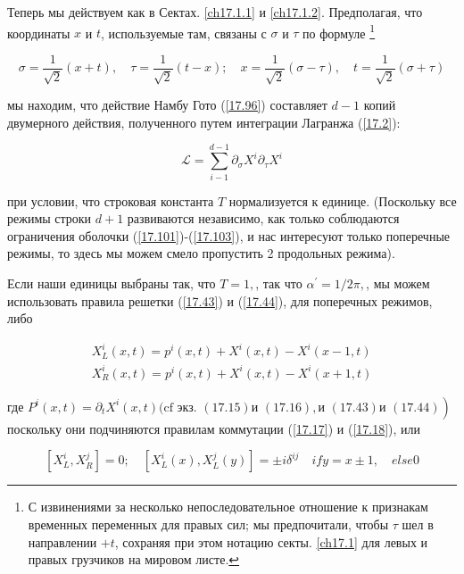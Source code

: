\documentclass[main.tex]{subfiles}
\begin{document}
Теперь мы действуем как в Сектах. \ref{ch17.1.1} и \ref{ch17.1.2}. Предполагая, что координаты $x$ и $t$, используемые там, связаны с $\sigma$ и $\tau$ по формуле \footnote{С извинениями за несколько непоследовательное отношение к признакам временных переменных для правых сил; мы предпочитали, чтобы $\tau$ шел в направлении $+t$, сохраняя при этом нотацию секты. \ref{ch17.1} для левых и правых грузчиков на мировом листе.}


\begin{equation}\label{17.111}
\sigma=\frac{1}{\sqrt{2}}(x+t), \quad \tau=\frac{1}{\sqrt{2}}(t-x) ; \quad x=\frac{1}{\sqrt{2}}(\sigma-\tau), \quad t=\frac{1}{\sqrt{2}}(\sigma+\tau)
\end{equation}

мы находим, что действие Намбу Гото (\ref{17.96}) составляет $d-1$ копий двумерного действия, полученного путем интеграции Лагранжа (\ref{17.2}):

\begin{equation}\label{17.112}
\mathcal{L}=\sum_{i-1}^{d-1} \partial_{\sigma} X^{i} \partial_{\tau} X^{i}
\end{equation}

при условии, что строковая константа $T$ нормализуется к единице. (Поскольку все режимы строки $d+1$ развиваются независимо, как только соблюдаются ограничения оболочки (\ref{17.101})-(\ref{17.103}), и нас интересуют только поперечные режимы, то здесь мы можем смело пропустить 2 продольных режима).

Если наши единицы выбраны так, что $T=1,$, так что $\alpha^{\prime}=1 / 2 \pi,$, мы можем использовать правила решетки (\ref{17.43}) и (\ref{17.44}), для поперечных режимов, либо

\begin{equation}\label{17.113}
\begin{array}{l}
{X_{L}^{i}(x, t)=p^{i}(x, t)+X^{i}(x, t)-X^{i}(x-1, t)} \\
{X_{R}^{i}(x, t)=p^{i}(x, t)+X^{i}(x, t)-X^{i}(x+1, t)}
\end{array}
\end{equation}

где $\left.P^{i}(x, t)=\partial_{t} X^{i}(x, t) \text {(cf экз. }(17.15) \text {и }(17.16), \text {и }(17.43) \text {и }(17.44)\right)$ поскольку они подчиняются правилам коммутации (\ref{17.17}) и (\ref{17.18}), или


\begin{equation}\label{17.115}
\left[X_{L}^{i}, X_{R}^{j}\right]=0 ; \quad\left[X_{L}^{i}(x), X_{L}^{j}(y)\right]=\pm i \delta^{i j} \quad  if y=x \pm 1, \quad else 0
\end{equation}
\end{document}
